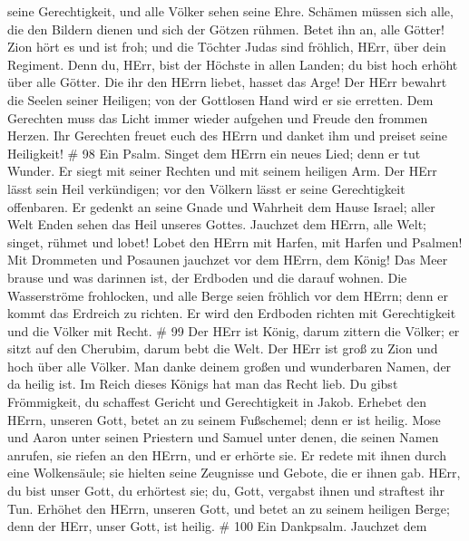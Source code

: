 seine Gerechtigkeit, und alle Völker sehen seine Ehre. 
Schämen müssen sich alle, die den Bildern dienen und sich der Götzen
rühmen. Betet ihn an, alle Götter!  Zion hört es und ist
froh; und die Töchter Judas sind fröhlich, HErr, über dein Regiment.
 Denn du, HErr, bist der Höchste in allen Landen; du bist
hoch erhöht über alle Götter.  Die ihr den HErrn liebet,
hasset das Arge! Der HErr bewahrt die Seelen seiner Heiligen; von der
Gottlosen Hand wird er sie erretten.  Dem Gerechten muss
das Licht immer wieder aufgehen und Freude den frommen Herzen.
 Ihr Gerechten freuet euch des HErrn und danket ihm und
preiset seine Heiligkeit! \# 98  Ein Psalm. Singet dem HErrn
ein neues Lied; denn er tut Wunder. Er siegt mit seiner Rechten und mit
seinem heiligen Arm.  Der HErr lässt sein Heil verkündigen;
vor den Völkern lässt er seine Gerechtigkeit offenbaren.  Er
gedenkt an seine Gnade und Wahrheit dem Hause Israel; aller Welt Enden
sehen das Heil unseres Gottes.  Jauchzet dem HErrn, alle
Welt; singet, rühmet und lobet!  Lobet den HErrn mit Harfen,
mit Harfen und Psalmen!  Mit Drommeten und Posaunen jauchzet
vor dem HErrn, dem König!  Das Meer brause und was darinnen
ist, der Erdboden und die darauf wohnen.  Die Wasserströme
frohlocken, und alle Berge seien fröhlich  vor dem HErrn;
denn er kommt das Erdreich zu richten. Er wird den Erdboden richten mit
Gerechtigkeit und die Völker mit Recht. \# 99  Der HErr ist
König, darum zittern die Völker; er sitzt auf den Cherubim, darum bebt
die Welt.  Der HErr ist groß zu Zion und hoch über alle
Völker.  Man danke deinem großen und wunderbaren Namen, der
da heilig ist.  Im Reich dieses Königs hat man das Recht
lieb. Du gibst Frömmigkeit, du schaffest Gericht und Gerechtigkeit in
Jakob.  Erhebet den HErrn, unseren Gott, betet an zu seinem
Fußschemel; denn er ist heilig.  Mose und Aaron unter seinen
Priestern und Samuel unter denen, die seinen Namen anrufen, sie riefen
an den HErrn, und er erhörte sie.  Er redete mit ihnen durch
eine Wolkensäule; sie hielten seine Zeugnisse und Gebote, die er ihnen
gab.  HErr, du bist unser Gott, du erhörtest sie; du, Gott,
vergabst ihnen und straftest ihr Tun.  Erhöhet den HErrn,
unseren Gott, und betet an zu seinem heiligen Berge; denn der HErr,
unser Gott, ist heilig. \# 100  Ein Dankpsalm. Jauchzet dem
